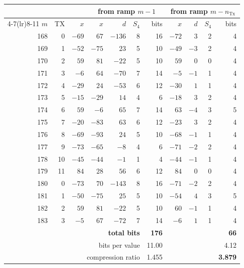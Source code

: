 \documentclass[10pt,a4paper]{article}
\newcommand{\tno}[1]{\textbf{#1}}
\begin{document}
\begin{center}
\begin{minipage}{0.98\textwidth}\centering
{}
\centering\small\setlength{\tabcolsep}{4pt}
\begin{tabular}{@{}rr r@{\hskip 8pt} rrrr @{\hskip 8pt} rrrr@{}}
\toprule
& & & \multicolumn{4}{c}{from ramp $m-1$} & \multicolumn{4}{c}{from ramp $m-n_{\mathrm{Tx}}$}\\
\cmidrule(lr){4-7}\cmidrule(lr){8-11}
$m$ & TX & $x$ & $\hat{x}$ & $d$ & $S_4$ & bits & $\hat{x}$ & $d$ & $S_4$ & bits\\
\midrule
168 & 0  & $-69$ & $67$  & $-136$ & 8 & 16 & $-72$ & $3$  & 2 & 4\\
169 & 1  & $-52$ & $-75$ & $23$   & 5 & 10 & $-49$ & $-3$ & 2 & 4\\
170 & 2  & $59$  & $81$  & $-22$  & 5 & 10 & $59$  & $0$  & 0 & 4\\
171 & 3  & $-6$  & $64$  & $-70$  & 7 & 14 & $-5$  & $-1$ & 1 & 4\\
172 & 4  & $-29$ & $24$  & $-53$  & 6 & 12 & $-30$ & $1$  & 1 & 4\\
173 & 5  & $-15$ & $-29$ & $14$   & 4 & 6  & $-18$ & $3$  & 2 & 4\\
174 & 6  & $59$  & $-6$  & $65$   & 7 & 14 & $63$  & $-4$ & 3 & 5\\
175 & 7  & $-20$ & $-83$ & $63$   & 6 & 12 & $-23$ & $3$  & 2 & 4\\
176 & 8  & $-69$ & $-93$ & $24$   & 5 & 10 & $-68$ & $-1$ & 1 & 4\\
177 & 9  & $-73$ & $-65$ & $-8$   & 4 & 6  & $-71$ & $-2$ & 2 & 4\\
178 & 10 & $-45$ & $-44$ & $-1$   & 1 & 4  & $-44$ & $-1$ & 1 & 4\\
179 & 11 & $84$  & $28$  & $56$   & 6 & 12 & $84$  & $0$  & 0 & 4\\
180 & 0  & $-73$ & $70$  & $-143$ & 8 & 16 & $-71$ & $-2$ & 2 & 4\\
181 & 1  & $-50$ & $-75$ & $25$   & 5 & 10 & $-54$ & $4$  & 3 & 5\\
182 & 2  & $59$  & $81$  & $-22$  & 5 & 10 & $60$  & $-1$ & 1 & 4\\
183 & 3  & $-5$  & $67$  & $-72$  & 7 & 14 & $-6$  & $1$  & 1 & 4\\
\midrule
\multicolumn{6}{r}{\tno{total bits}} & \tno{176} & & & & \tno{66}\\
\multicolumn{6}{r}{bits per value} & 11.00 & & & & 4.12\\
\multicolumn{6}{r}{compression ratio} & 1.455 & & & & \tno{3.879}\\
\bottomrule
\end{tabular}
\end{minipage}
\end{center}
\end{document}
